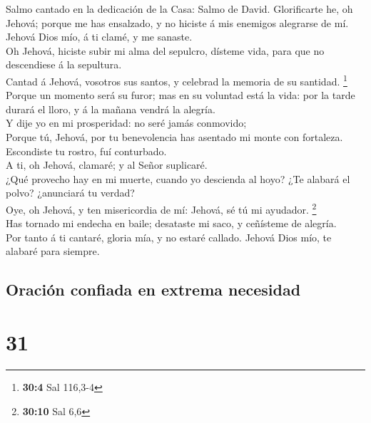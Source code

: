  Salmo cantado en la dedicación de la Casa: Salmo de
David. Glorificarte he, oh Jehová; porque me has ensalzado, y no hiciste
á mis enemigos alegrarse de mí.\\
 Jehová Dios mío, á ti clamé, y me sanaste.\\
 Oh Jehová, hiciste subir mi alma del sepulcro, dísteme
vida, para que no descendiese á la sepultura.\\
 Cantad á Jehová, vosotros sus santos, y celebrad la
memoria de su santidad. \footnote{\textbf{30:4} Sal 116,3-4}\\
 Porque un momento será su furor; mas en su voluntad está
la vida: por la tarde durará el lloro, y á la mañana vendrá la
alegría.\\
 Y dije yo en mi prosperidad: no seré jamás conmovido;\\
 Porque tú, Jehová, por tu benevolencia has asentado mi
monte con fortaleza. Escondiste tu rostro, fuí conturbado.\\
 A ti, oh Jehová, clamaré; y al Señor suplicaré.\\
 ¿Qué provecho hay en mi muerte, cuando yo descienda al
hoyo? ¿Te alabará el polvo? ¿anunciará tu verdad?\\
 Oye, oh Jehová, y ten misericordia de mí: Jehová, sé tú
mi ayudador. \footnote{\textbf{30:10} Sal 6,6}\\
 Has tornado mi endecha en baile; desataste mi saco, y
ceñísteme de alegría.\\
 Por tanto á ti cantaré, gloria mía, y no estaré callado.
Jehová Dios mío, te alabaré para siempre.

\hypertarget{oraciuxf3n-confiada-en-extrema-necesidad}{%
\subsection{Oración confiada en extrema
necesidad}\label{oraciuxf3n-confiada-en-extrema-necesidad}}

\hypertarget{section-30}{%
\section{31}\label{section-30}}

